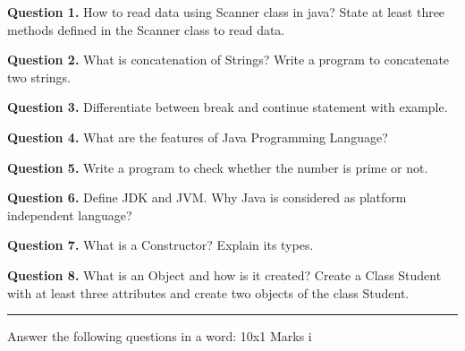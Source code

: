 \documentclass[11pt,a4paper]{article}
\begin{document}
\medskip\noindent\textbf{Question 1.} How to read data using Scanner class in java? State at least three methods defined in the Scanner class to
read data.

\medskip\noindent\textbf{Question 2.} What is concatenation of Strings? Write a program to concatenate two strings.

\medskip\noindent\textbf{Question 3.} Differentiate between break and continue statement with example.

\medskip\noindent\textbf{Question 4.} What are the features of Java Programming Language?

\medskip\noindent\textbf{Question 5.} Write a program to check whether the number is prime or not.

\medskip\noindent\textbf{Question 6.} Define JDK and JVM. Why Java is considered as platform independent language?

\medskip\noindent\textbf{Question 7.} What is a Constructor? Explain its types.

\medskip\noindent\textbf{Question 8.} What is an Object and how is it created? Create a Class Student with at least three attributes and create
two objects of the class Student.

\bigskip{}
\rule{\linewidth}{0.4pt}\smallskip

Answer the following questions in a word: 10x1 Marks i
\end{document}
